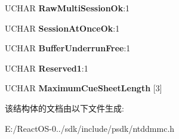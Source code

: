\begin{DoxyCompactItemize}
U\+C\+H\+AR {\bfseries Raw\+Multi\+Session\+Ok}\+:1
\item 
\mbox{\label{struct___f_e_a_t_u_r_e___d_a_t_a___c_d___m_a_s_t_e_r_i_n_g_ae49185cef75e17c4ed9775847a5e202d}} 
U\+C\+H\+AR {\bfseries Session\+At\+Once\+Ok}\+:1
\item 
\mbox{\label{struct___f_e_a_t_u_r_e___d_a_t_a___c_d___m_a_s_t_e_r_i_n_g_ab65fab1b93c6e5ba0107354223aeb2e0}} 
U\+C\+H\+AR {\bfseries Buffer\+Underrun\+Free}\+:1
\item 
\mbox{\label{struct___f_e_a_t_u_r_e___d_a_t_a___c_d___m_a_s_t_e_r_i_n_g_adc80cada2ec1824d6e236b5958743914}} 
U\+C\+H\+AR {\bfseries Reserved1}\+:1
\item 
\mbox{\label{struct___f_e_a_t_u_r_e___d_a_t_a___c_d___m_a_s_t_e_r_i_n_g_ad4118e098a1a108d6aaeb86564894ce6}} 
U\+C\+H\+AR {\bfseries Maximum\+Cue\+Sheet\+Length} \mbox{[}3\mbox{]}
\end{DoxyCompactItemize}


该结构体的文档由以下文件生成\+:\begin{DoxyCompactItemize}
\item 
E\+:/\+React\+O\+S-\/0../sdk/include/psdk/ntddmmc.\+h\end{DoxyCompactItemize}
